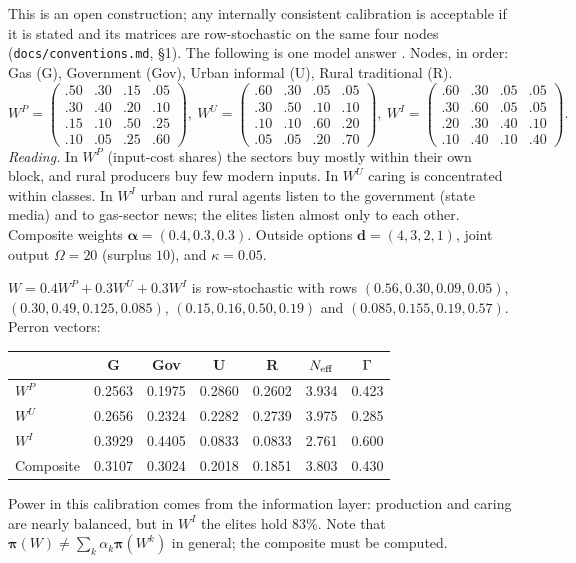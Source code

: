 \documentclass[../solutions_manual.tex]{subfiles}
\begin{document}
This is an open construction; any internally consistent calibration is acceptable if it is stated and its matrices are row-stochastic on the same four nodes (\nolinkurl{docs/conventions.md}, \S1). The following is one model answer \illustrative. Nodes, in order: Gas (G), Government (Gov), Urban informal (U), Rural traditional (R).
\begingroup\footnotesize
\[
W^P = \begin{pmatrix} .50 & .30 & .15 & .05 \\ .30 & .40 & .20 & .10 \\ .15 & .10 & .50 & .25 \\ .10 & .05 & .25 & .60\end{pmatrix},\ 
W^U = \begin{pmatrix} .60 & .30 & .05 & .05 \\ .30 & .50 & .10 & .10 \\ .10 & .10 & .60 & .20 \\ .05 & .05 & .20 & .70\end{pmatrix},\ 
W^I = \begin{pmatrix} .60 & .30 & .05 & .05 \\ .30 & .60 & .05 & .05 \\ .20 & .30 & .40 & .10 \\ .10 & .40 & .10 & .40\end{pmatrix}.
\]
\endgroup
\emph{Reading.} In $W^P$ (input-cost shares) the sectors buy mostly within their own block, and rural producers buy few modern inputs. In $W^U$ caring is concentrated within classes. In $W^I$ urban and rural agents listen to the government (state media) and to gas-sector news; the elites listen almost only to each other. Composite weights $\boldsymbol{\alpha} = (0.4, 0.3, 0.3)$. Outside options $\boldsymbol{d} = (4, 3, 2, 1)$, joint output $\Omega = 20$ (surplus $10$), and $\kappa = 0.05$.

\solpart{a} $W = 0.4W^P + 0.3W^U + 0.3W^I$ is row-stochastic with rows $(0.56, 0.30, 0.09, 0.05)$, $(0.30, 0.49, 0.125, 0.085)$, $(0.15, 0.16, 0.50, 0.19)$ and $(0.085, 0.155, 0.19, 0.57)$. Perron vectors:
\begin{center}
\begin{tabular}{lcccccc}
\toprule
& G & Gov & U & R & $N_{\text{eff}}$ & $\Gamma$ \\
\midrule
$W^P$ & 0.2563 & 0.1975 & 0.2860 & 0.2602 & 3.934 & 0.423 \\
$W^U$ & 0.2656 & 0.2324 & 0.2282 & 0.2739 & 3.975 & 0.285 \\
$W^I$ & 0.3929 & 0.4405 & 0.0833 & 0.0833 & 2.761 & 0.600 \\
Composite & 0.3107 & 0.3024 & 0.2018 & 0.1851 & 3.803 & 0.430 \\
\bottomrule
\end{tabular}
\end{center}
Power in this calibration comes from the information layer: production and caring are nearly balanced, but in $W^I$ the elites hold $83\%$. Note that $\boldsymbol{\pi}(W) \neq \sum_k\alpha_k\boldsymbol{\pi}(W^k)$ in general; the composite must be computed.
\end{document}

